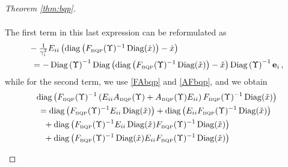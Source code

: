 \documentclass[smallextended]{svjour3hack}       %
\DeclareMathOperator{\Diag}{Diag}
\DeclareMathOperator{\diag}{diag}
\begin{document}
\begin{proof}[Theorem \ref{thm:bqp}]
\begin{itemize}
\begin{align*}
\end{align*}
The first term in this last expression can be reformulated as
 \begin{align*}
    &-\textstyle\frac{1}{\gamma_i^2}E_{ii}\left(\diag\left(F_{{\tiny\mbox{BQP}}}(\Upsilon)^{-1}\Diag(\check{x})\right)-\check{x}\right)\\
     &~= -  \Diag\left(\Upsilon\right)^{-1} \Diag\left(\diag\left(F_{{\tiny\mbox{BQP}}}(\Upsilon)^{-1}\Diag(\check{x})\right)-\check{x}\right)
     \Diag\left(\Upsilon\right)^{-1} \mathbf{e}_i\,,
 \end{align*}
 while for the second term, we use \eqref{FAbqp} and \eqref{AFbqp}, and we obtain
 \begin{align*}
     &\diag\left(F_{{\tiny\mbox{BQP}}}(\Upsilon)^{-1}\left(E_{ii}A_{{\tiny\mbox{BQP}}}(\Upsilon)+A_{{\tiny\mbox{BQP}}}(\Upsilon) E_{ii}\right) F_{{\tiny\mbox{BQP}}}(\Upsilon)^{-1}\Diag(\check{x})\right)\\
     &~= \diag\left(F_{{\tiny\mbox{BQP}}}(\Upsilon)^{-1}E_{ii}\Diag(\check{x})\right)+ \diag\left( E_{ii}F_{{\tiny\mbox{BQP}}}(\Upsilon)^{-1}\Diag(\check{x})\right)\\
     & \quad +\diag\left(F_{{\tiny\mbox{BQP}}}(\Upsilon)^{-1}E_{ii} \Diag(\check{x}) F_{{\tiny\mbox{BQP}}}(\Upsilon)^{-1}\Diag(\check{x})\right)\\
     & \quad +\diag\left( F_{{\tiny\mbox{BQP}}}(\Upsilon)^{-1}\Diag(\check{x})E_{ii} F_{{\tiny\mbox{BQP}}}(\Upsilon)^{-1}\Diag(\check{x})\right)\\

\end{align*}
\end{itemize}
\end{proof}
\end{document}
